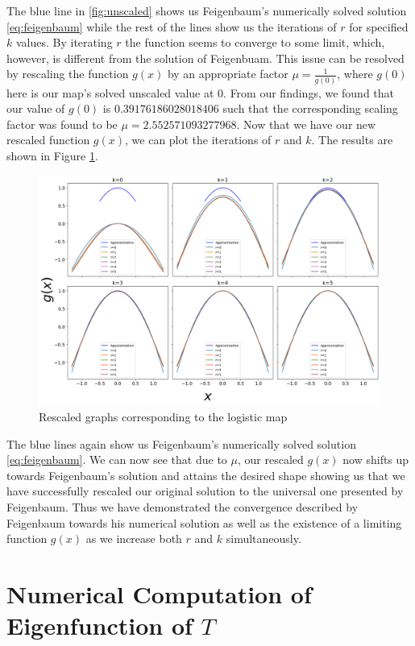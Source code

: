 \begin{exmp}
    The blue line in \ref{fig:unscaled} shows us Feigenbaum's numerically solved solution \eqref{eq:feigenbaum} while the rest of the lines show us the iterations of $r$ for specified $k$ values. 
	By iterating $r$ the function seems to converge to some limit, which, however, is different from the solution of Feigenbuam.
	This issue can be resolved by rescaling the function $g(x)$ by an appropriate factor $\mu = \frac{1}{g(0)}$, where $g(0)$ here is our map's solved unscaled value at 0. 
    From our findings, we found that our value of $g(0)$ is $0.39176186028018406$ such that the corresponding scaling factor was found to be $\mu= 2.552571093277968$. Now that we have our new rescaled function $g(x)$, we can plot the iterations of $r$ and $k$. 
	The results are shown in Figure \ref{fig:rescaled}.
    \begin{figure}
    \centering
    \includegraphics[width=1\textwidth]{Feigenbaum Approx Graphs/feigenbaum_scaled.png}
    \caption{Rescaled graphs corresponding to the logistic map}
    \label{fig:rescaled}
\end{figure}
The blue lines again show us Feigenbaum's numerically solved solution \eqref{eq:feigenbaum}. 
We can now see that due to $\mu$, our rescaled $g(x)$ now shifts up towards Feigenbaum's solution and attains the desired shape showing us that we have successfully rescaled our original solution to the universal one presented by Feigenbaum. 
Thus we have demonstrated the convergence described by Feigenbaum towards his numerical solution as well as the existence of a limiting function $g(x)$ as we increase both $r$ and $k$ simultaneously. 
\end{exmp}


\section{Numerical Computation of Eigenfunction of $T$}

